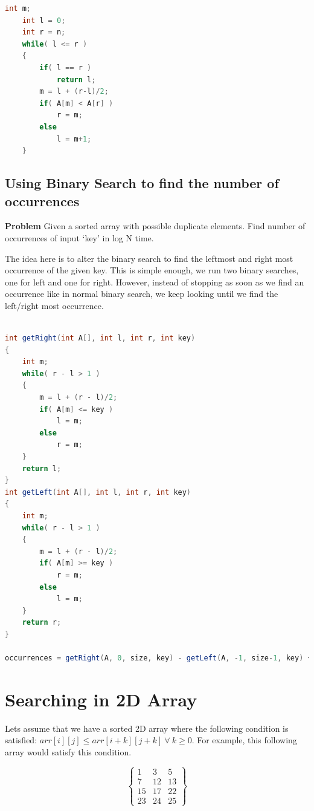 \documentclass{article}
\begin{document}
\begin{lstlisting}[language=Java, title=Pseudocode]
    int m;
    int l = 0;
    int r = n;
    while( l <= r )
    {
        if( l == r )
            return l;
        m = l + (r-l)/2; 
        if( A[m] < A[r] )
            r = m;
        else
            l = m+1;
    }
\end{lstlisting}
\subsection{Using Binary Search to find the number of occurrences}
\textbf{Problem} Given a sorted array with possible duplicate elements. Find number of occurrences of input ‘key’ in log N time.

The idea here is to alter the binary search to find the leftmost and right most occurrence of the given key. This is simple enough, we run two binary searches, one for left and one for right. However, instead of stopping as soon as we find an occurrence like in normal binary search, we keep looking until we find the left/right most occurrence.

\begin{lstlisting}[language=Java, title=Pseudocode]

int getRight(int A[], int l, int r, int key)
{
    int m;
    while( r - l > 1 )
    {
        m = l + (r - l)/2;
        if( A[m] <= key )
            l = m;
        else
            r = m;
    }
    return l;
}
int getLeft(int A[], int l, int r, int key)
{
    int m;
    while( r - l > 1 )
    {
        m = l + (r - l)/2;
        if( A[m] >= key )
            r = m;
        else
            l = m;
    }
    return r;
}

occurrences = getRight(A, 0, size, key) - getLeft(A, -1, size-1, key) + 1
\end{lstlisting}
\section{Searching in 2D Array}
Lets assume that we have a sorted 2D array where the following condition is satisfied: $arr[i][j] \leq arr[i+k][j+k]~\forall~k \geq 0$. For example, this following array would satisfy this condition.

\[
\begin{Bmatrix}
1 & 3 & 5\\
7 & 12 & 13\\
15 & 17 & 22\\
23 & 24 & 25
\end{Bmatrix}
\]
\end{document}
